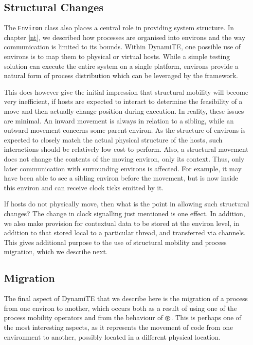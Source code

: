 \subsection{Structural Changes}
\label{dyn:structchange}

The \texttt{Environ} class also places a central role in providing
system structure.  In chapter \ref{nt}, we described how
processes are organised into environs and the way communication is
limited to its bounds.  Within DynamiTE, one possible use of environs
is to map them to physical or virtual hosts.  While a simple testing
solution can execute the entire system on a single platform, environs
provide a natural form of process distribution which can be leveraged by
the framework.

This does however give the initial impression that structural mobility
will become very inefficient, if hosts are expected to interact to
determine the feasibility of a move and then actually change position
during execution.  In reality, these issues are minimal.  An inward
movement is always in relation to a sibling, while an outward movement
concerns some parent environ.  As the structure of environs is expected
to closely match the actual physical structure of the hosts, such
interactions should be relatively low cost to perform.  Also, a
structural movement does not change the contents of the moving environ,
only its context.  Thus, only later communication with surrounding
environs is affected.  For example, it may have been able to see a
sibling environ before the movement, but is now inside this environ and
can receive clock ticks emitted by it.

If hosts do not physically move, then what is the point in allowing such
structural changes?  The change in clock signalling just mentioned is
one effect.  In addition, we also make provision for contextual data to
be stored at the environ level, in addition to that stored local to a
particular thread, and transferred via channels.  This gives additional
purpose to the use of structural mobility and process migration, which
we describe next.

\subsection{Migration}
\label{dyn:migration}

The final aspect of DynamiTE that we describe here is the migration of a
process from one environ to another, which occurs both as a result of
using one of the process mobility operators and from the behaviour of
$\tntopen$.  This is perhaps one of the most interesting aspects, as it
represents the movement of code from one environment to another,
possibly located in a different physical location.

